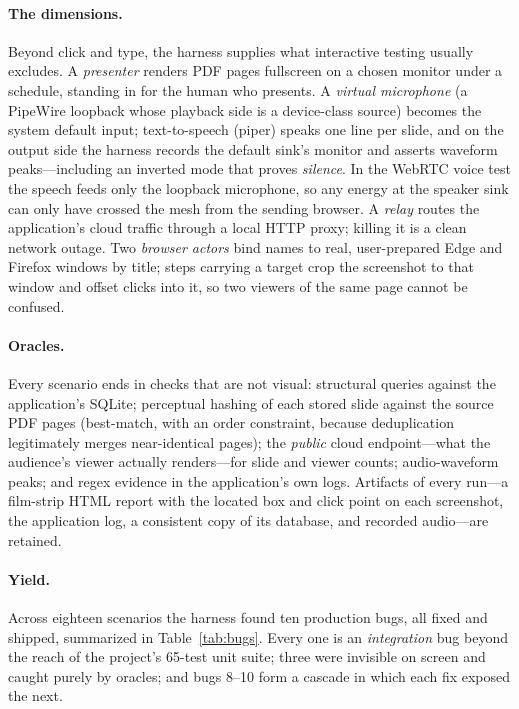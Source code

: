 \documentclass[acmsmall,screen,nonacm]{acmart}
\theoremstyle{acmdefinition}%
\theoremstyle{acmplain}%
\begin{document}
\paragraph{The dimensions.} Beyond click and type, the harness supplies
what interactive testing usually excludes. A \emph{presenter} renders PDF
pages fullscreen on a chosen monitor under a schedule, standing in for
the human who presents. A \emph{virtual microphone} (a PipeWire loopback
whose playback side is a device-class source) becomes the system default
input; text-to-speech (piper) speaks one line per slide, and on the
output side the harness records the default sink's monitor and asserts
waveform peaks---including an inverted mode that proves \emph{silence}. In
the WebRTC voice test the speech feeds only the loopback microphone, so
any energy at the speaker sink can only have crossed the mesh from the
sending browser. A \emph{relay} routes the application's cloud traffic
through a local HTTP proxy; killing it is a clean network outage. Two
\emph{browser actors} bind names to real, user-prepared Edge and Firefox
windows by title; steps carrying a target crop the screenshot to that
window and offset clicks into it, so two viewers of the same page cannot
be confused.

\paragraph{Oracles.} Every scenario ends in checks that are not visual:
structural queries against the application's SQLite; perceptual hashing of
each stored slide against the source PDF pages (best-match, with an order
constraint, because deduplication legitimately merges near-identical
pages); the \emph{public} cloud endpoint---what the audience's viewer
actually renders---for slide and viewer counts; audio-waveform peaks; and
regex evidence in the application's own logs. Artifacts of every run---a
film-strip HTML report with the located box and click point on each
screenshot, the application log, a consistent copy of its database, and
recorded audio---are retained.

\paragraph{Yield.} Across eighteen scenarios the harness found ten
production bugs, all fixed and shipped, summarized in
Table~\ref{tab:bugs}. Every one is an \emph{integration} bug beyond the
reach of the project's 65-test unit suite; three were invisible on screen
and caught purely by oracles; and bugs 8--10 form a cascade in which each
fix exposed the next.
\end{document}
